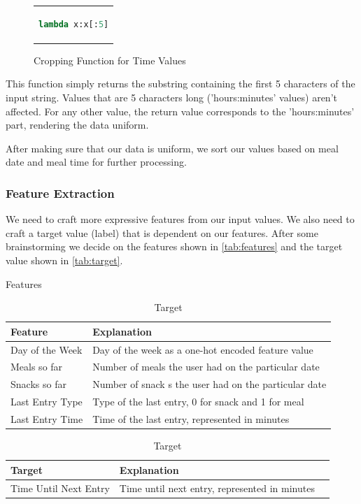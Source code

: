 \begin{figure}[htpb]
  \centering
  \begin{tabular}{c}
  \begin{lstlisting}[language=python]
lambda x:x[:5]
  \end{lstlisting}
  \end{tabular}
  \caption[Cropping Function for Time Values]{Cropping Function for Time Values}
  \label{fig:code_clean}
\end{figure}

This function simply returns the substring containing the first 5 characters of the input string.
Values that are 5 characters long ('hours:minutes' values) aren't affected.
For any other value, the return value corresponds to the 'hours:minutes' part, rendering the data uniform.

After making sure that our data is uniform, we sort our values based on meal date and meal time for further processing.
\subsubsection{Feature Extraction}
We need to craft more expressive features from our input values.
We also need to craft a target value (label) that is dependent on our features.
After some brainstorming we decide on the features shown in \autoref{tab:features} and the target value shown in \autoref{tab:target}.

\begin{table}[htbp]
  \caption[Features]{Features}
  \label{tab:features}
  \centering
  \begin{tabular}{l|l}
    Feature&Explanation\\ \toprule
    Day of the Week&Day of the week as a one-hot encoded feature value\\ \hline
    Meals so far&Number of meals the user had on the particular date\\ \hline
    Snacks so far&Number of snack s the user had on the particular date\\ \hline
    Last Entry Type&Type of the last entry, 0 for snack and 1 for meal\\ \hline
    Last Entry Time&Time of the last entry, represented in minutes\\ \hline
  \end{tabular}

  \caption[Target]{Target}
  \label{tab:target}
  \centering
  \begin{tabular}{l|l|l}
    Target&Explanation\\ \toprule
    Time Until Next Entry&Time until next entry, represented in minutes\\ \hline
  \end{tabular}
\end{table}

